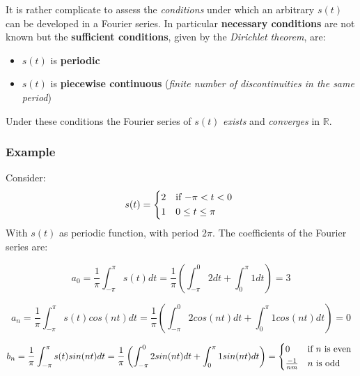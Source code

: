 \documentclass[10pt,a4paper]{report}
\theoremstyle{definition}
\begin{document}
It is rather complicate to assess the \textit{conditions} under which an arbitrary $s(t)$ can be developed in a Fourier series. In particular \textbf{necessary conditions} are not known but the \textbf{sufficient conditions}, given by the \textit{Dirichlet theorem}, are:
\begin{itemize}
	\item 
	$s(t)$ is \textbf{periodic}
	\item 
	$s(t)$ is \textbf{piecewise continuous} (\textit{finite number of discontinuities in the same period})
	
\end{itemize}
Under these conditions the Fourier series of $s(t)$ \textit{exists} and \textit{converges} in $\mathbb{R}$.


\subsubsection{Example}\label{sec:example}
Consider:
\begin{equation}
	s(t) =
	\begin{cases*}
		2 & if $-\pi < t <0$ \\
		1        & $0 \leq t \leq \pi$
	\end{cases*}
\end{equation}
With $s(t)$ as periodic function, with period $2 \pi$. 
The coefficients of the Fourier series are:

	
	\begin{equation}
		a_{0} = \frac{1}{\pi}\int_{-\pi}^{\pi} s(t)dt = \frac{1}{\pi}\left(\int_{-\pi}^{0} 2dt + \int_{0}^{\pi} 1dt\right) = 3
	\end{equation}
	
	\begin{equation}
			 a_{n} = \frac{1}{\pi}\int_{-\pi}^{\pi} s(t)cos(nt)dt = \frac{1}{\pi}\left(\int_{-\pi}^{0} 2cos(nt)dt + \int_{0}^{\pi} 1cos(nt)dt\right) = 0
	\end{equation}

	\begin{equation}
		b_{n} = \frac{1}{\pi}\int_{-\pi}^{\pi} s(t)sin(nt)dt = \frac{1}{\pi}\left(\int_{-\pi}^{0} 2sin(nt)dt + \int_{0}^{\pi} 1sin(nt)dt\right) =
		\begin{cases*}
			0 & if $n$ is even \\
			\frac{-1}{nm}        & $n$ is odd
		\end{cases*}
	\end{equation}
\end{document}
